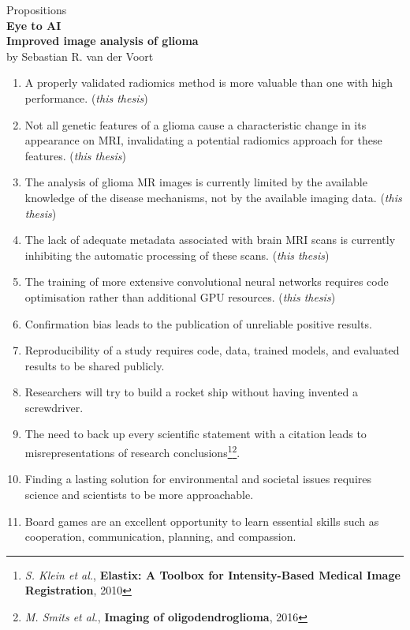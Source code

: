 \documentclass{article}
\begin{document}
\thispagestyle{empty}
\begin{centering}
{\Large Propositions}\\
\vspace{2em}
\textbf{\LARGE Eye to AI}\\
\textbf{\LARGE Improved image analysis of glioma}\\
\vspace{2em}
{\large by Sebastian R. van der Voort}\\
\end{centering}
\vspace{5em}
\begin{enumerate}
    \item A properly validated radiomics method is more valuable than one with high performance. (\textit{this thesis})
    \item Not all genetic features of a glioma cause a characteristic change in its appearance on MRI, invalidating a potential radiomics approach for these features. (\textit{this thesis})
    \item The analysis of glioma MR images is currently limited by the available knowledge of the disease mechanisms, not by the available imaging data. (\textit{this thesis})
    \item The lack of adequate metadata associated with brain MRI scans is currently inhibiting the automatic processing of these scans. (\textit{this thesis})
    \item The training of more extensive convolutional neural networks requires code optimisation rather than additional GPU resources. (\textit{this thesis})
    \item Confirmation bias leads to the publication of unreliable positive results.
    \item Reproducibility of a study requires code, data, trained models, and evaluated results to be shared publicly.
    \item Researchers will try to build a rocket ship without having invented a screwdriver.
    \item The need to back up every scientific statement with a citation leads to misrepresentations of research conclusions\footnote{\textit{S. Klein et al.}, \textbf{Elastix: A Toolbox for Intensity-Based Medical Image Registration}, 2010}\footnote{\textit{M. Smits et al.}, \textbf{Imaging of oligodendroglioma}, 2016}.
    \item Finding a lasting solution for environmental and societal issues requires science and scientists to be more approachable.
    \item Board games are an excellent opportunity to learn essential skills such as cooperation, communication, planning, and compassion.
\end{enumerate}
\end{document}
